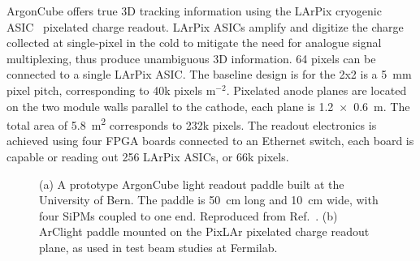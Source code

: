 ArgonCube offers true 3D tracking information using the LArPix cryogenic ASIC~\cite{larpix} pixelated charge readout. LArPix ASICs amplify and digitize the charge collected at single-pixel in the cold to mitigate the need for analogue signal multiplexing, thus produce unambiguous 3D information. 64 pixels can be connected to a single LArPix ASIC. The baseline design is for the 2x2 is a \SI{5}{\milli\metre} pixel pitch, corresponding to 40k pixels m$^{-2}$. Pixelated anode planes are located on the two module walls parallel to the cathode, each plane is  \SI[product-units=repeat]{1.2x0.6}{\metre}. The total area of \SI{5.8}{\metre\squared} corresponds to 232k pixels. The readout electronics is achieved using four FPGA boards connected to an Ethernet switch, each board is capable or reading out 256 LArPix ASICs, or 66k pixels.

\begin{figure}[!ht]
	\centering
	\caption{(a) A prototype ArgonCube light readout paddle built at the University of Bern. The paddle is 50~cm long and 10~cm wide, with four SiPMs coupled to one end. Reproduced from Ref.~\cite{argoncube_loi}. (b) ArClight paddle mounted on the PixLAr pixelated charge readout plane, as used in test beam studies at Fermilab.}
	\label{fig:arclight}
\end{figure}

